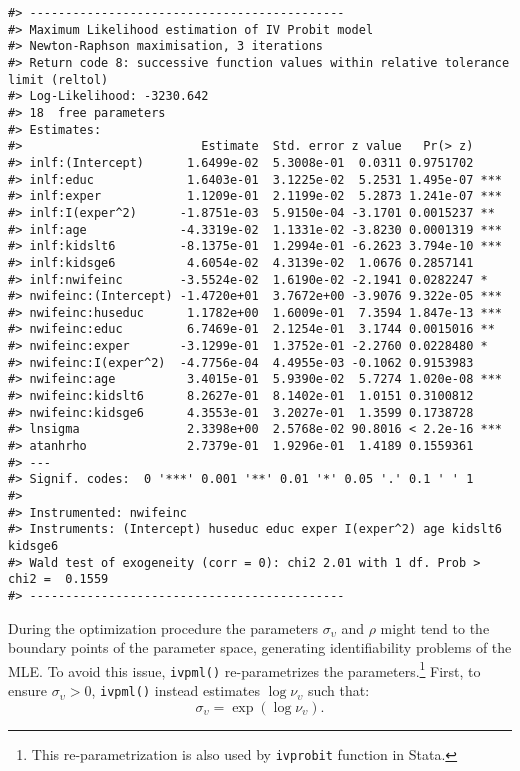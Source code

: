 \begin{verbatim}
#> --------------------------------------------
#> Maximum Likelihood estimation of IV Probit model 
#> Newton-Raphson maximisation, 3 iterations
#> Return code 8: successive function values within relative tolerance limit (reltol)
#> Log-Likelihood: -3230.642 
#> 18  free parameters
#> Estimates:
#>                         Estimate  Std. error z value   Pr(> z)    
#> inlf:(Intercept)      1.6499e-02  5.3008e-01  0.0311 0.9751702    
#> inlf:educ             1.6403e-01  3.1225e-02  5.2531 1.495e-07 ***
#> inlf:exper            1.1209e-01  2.1199e-02  5.2873 1.241e-07 ***
#> inlf:I(exper^2)      -1.8751e-03  5.9150e-04 -3.1701 0.0015237 ** 
#> inlf:age             -4.3319e-02  1.1331e-02 -3.8230 0.0001319 ***
#> inlf:kidslt6         -8.1375e-01  1.2994e-01 -6.2623 3.794e-10 ***
#> inlf:kidsge6          4.6054e-02  4.3139e-02  1.0676 0.2857141    
#> inlf:nwifeinc        -3.5524e-02  1.6190e-02 -2.1941 0.0282247 *  
#> nwifeinc:(Intercept) -1.4720e+01  3.7672e+00 -3.9076 9.322e-05 ***
#> nwifeinc:huseduc      1.1782e+00  1.6009e-01  7.3594 1.847e-13 ***
#> nwifeinc:educ         6.7469e-01  2.1254e-01  3.1744 0.0015016 ** 
#> nwifeinc:exper       -3.1299e-01  1.3752e-01 -2.2760 0.0228480 *  
#> nwifeinc:I(exper^2)  -4.7756e-04  4.4955e-03 -0.1062 0.9153983    
#> nwifeinc:age          3.4015e-01  5.9390e-02  5.7274 1.020e-08 ***
#> nwifeinc:kidslt6      8.2627e-01  8.1402e-01  1.0151 0.3100812    
#> nwifeinc:kidsge6      4.3553e-01  3.2027e-01  1.3599 0.1738728    
#> lnsigma               2.3398e+00  2.5768e-02 90.8016 < 2.2e-16 ***
#> atanhrho              2.7379e-01  1.9296e-01  1.4189 0.1559361    
#> ---
#> Signif. codes:  0 '***' 0.001 '**' 0.01 '*' 0.05 '.' 0.1 ' ' 1
#> 
#> Instrumented: nwifeinc
#> Instruments: (Intercept) huseduc educ exper I(exper^2) age kidslt6 kidsge6 
#> Wald test of exogeneity (corr = 0): chi2 2.01 with 1 df. Prob > chi2 =  0.1559 
#> --------------------------------------------
\end{verbatim}

During the optimization procedure the parameters \(\sigma_{\upsilon}\) and \(\rho\) might tend to the boundary points of the parameter space, generating identifiability problems of the MLE. To avoid this issue, \texttt{ivpml()} re-parametrizes the parameters.\footnote{This re-parametrization is also used by \texttt{ivprobit} function in Stata.} First, to ensure \(\sigma_{\upsilon} > 0\), \texttt{ivpml()} instead estimates \(\log \nu_{\upsilon}\) such that:
\begin{equation}
\sigma_{\upsilon} = \exp(\log \nu_{\upsilon}). 
  \label{eq:repsigma}
\end{equation}

